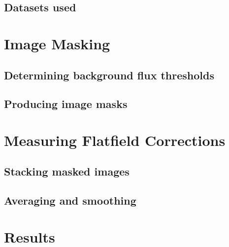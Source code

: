 \documentclass[letterpaper,11pt]{article}
\begin{document}
\subsection{Datasets used}
\label{ssec:mask_stacks_and_mean_images}

\section{Image Masking}
\label{sec:image_masking}

\subsection{Determining background flux thresholds}
\label{ssec:determining_background_flux_thresholds}

\subsection{Producing image masks}
\label{ssec:producing_image_masks}

\section{Measuring Flatfield Corrections}
\label{sec:measuring_flatfield_corrections}

\subsection{Stacking masked images}
\label{ssec:stacking_masked_images}

\subsection{Averaging and smoothing}
\label{ssec:averaging_and_smoothing}

\section{Results}
\label{sec:results}
\end{document}
